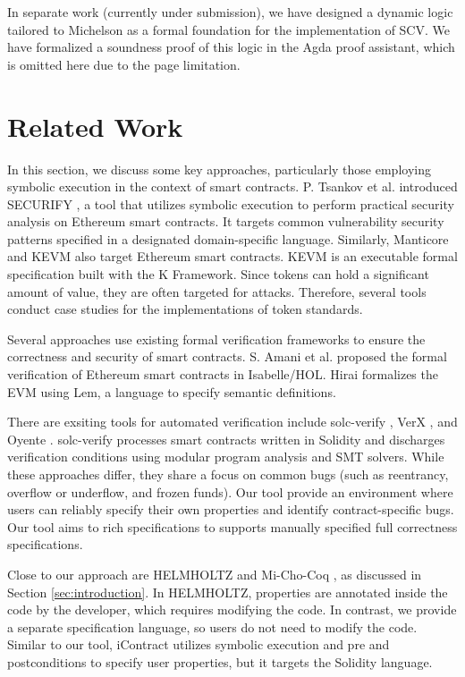 \documentclass[runningheads]{llncs}
\begin{document}
In separate work (currently under submission), we have designed a dynamic logic tailored to Michelson as a formal foundation for the implementation of SCV. We have formalized a soundness proof of this logic in the Agda proof assistant, which is omitted here due to the page limitation.
\section{Related Work}
\label{sec:related-work}

In this section, we discuss some key approaches, particularly those employing symbolic execution in the context of smart contracts. P. Tsankov et al. introduced
SECURIFY \cite{securify}, a tool that utilizes symbolic execution to
perform practical security analysis on Ethereum smart contracts. It
targets common vulnerability security patterns specified in a
designated domain-specific language. 
Similarly, Manticore
\cite{manticore} and KEVM \cite{kevm} also target Ethereum smart contracts. KEVM is an executable formal
specification built with the K Framework.
Since tokens can hold a significant amount of value, they are often targeted for
attacks. Therefore, several tools \cite{kevm,park} conduct case
studies for the implementations of token standards. 

Several approaches use existing formal verification frameworks to
ensure the correctness and security of smart contracts. S. Amani et
al. \cite{isabelle} proposed the formal verification of Ethereum smart
contracts in Isabelle/HOL. Hirai \cite{hirai} formalizes the EVM using
Lem, a language to specify semantic definitions. 

There are exsiting tools for automated verification include solc-verify \cite{solc}, VerX \cite{verx}, and Oyente \cite{oyente}. solc-verify processes smart contracts written in Solidity and discharges verification conditions using modular program analysis and SMT solvers.
While these approaches differ, they share a focus on common bugs (such as reentrancy, overflow or underflow, and frozen funds). Our tool provide an environment where users can reliably specify their own properties and identify contract-specific bugs. Our tool aims to rich specifications to supports manually specified full correctness specifications.


Close to our approach are HELMHOLTZ \cite{helmholtz} and Mi-Cho-Coq \cite{micho}, as discussed in Section \ref{sec:introduction}. In HELMHOLTZ, properties are annotated inside the code by the developer, which requires modifying the code. In contrast, we provide a separate specification language, so users do not need to modify the code. Similar to our tool, iContract \cite{icontract} utilizes symbolic execution and pre and postconditions to specify user properties, but it targets the Solidity language.
\end{document}
